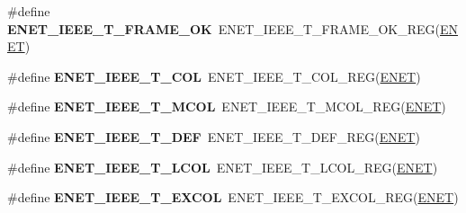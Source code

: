 \begin{DoxyCompactItemize}
\item 
\#define {\bfseries E\+N\+E\+T\+\_\+\+I\+E\+E\+E\+\_\+\+T\+\_\+\+F\+R\+A\+M\+E\+\_\+\+OK}~E\+N\+E\+T\+\_\+\+I\+E\+E\+E\+\_\+\+T\+\_\+\+F\+R\+A\+M\+E\+\_\+\+O\+K\+\_\+\+R\+EG(\hyperlink{group__ENET__Peripheral__Access__Layer_ga4745105f505f3ab949d6a57fbe2a0ed5}{E\+N\+ET})\hypertarget{group__ENET__Register__Accessor__Macros_ga321b9547e8c7a8dd69206b0d86ba917b}{}\label{group__ENET__Register__Accessor__Macros_ga321b9547e8c7a8dd69206b0d86ba917b}

\item 
\#define {\bfseries E\+N\+E\+T\+\_\+\+I\+E\+E\+E\+\_\+\+T\+\_\+C\+OL}~E\+N\+E\+T\+\_\+\+I\+E\+E\+E\+\_\+\+T\+\_\+C\+O\+L\+\_\+\+R\+EG(\hyperlink{group__ENET__Peripheral__Access__Layer_ga4745105f505f3ab949d6a57fbe2a0ed5}{E\+N\+ET})\hypertarget{group__ENET__Register__Accessor__Macros_gae66d0c804b174cf33bec1d515ea032e8}{}\label{group__ENET__Register__Accessor__Macros_gae66d0c804b174cf33bec1d515ea032e8}

\item 
\#define {\bfseries E\+N\+E\+T\+\_\+\+I\+E\+E\+E\+\_\+\+T\+\_\+\+M\+C\+OL}~E\+N\+E\+T\+\_\+\+I\+E\+E\+E\+\_\+\+T\+\_\+\+M\+C\+O\+L\+\_\+\+R\+EG(\hyperlink{group__ENET__Peripheral__Access__Layer_ga4745105f505f3ab949d6a57fbe2a0ed5}{E\+N\+ET})\hypertarget{group__ENET__Register__Accessor__Macros_gad96c85c312dbc71abf1716be0e465139}{}\label{group__ENET__Register__Accessor__Macros_gad96c85c312dbc71abf1716be0e465139}

\item 
\#define {\bfseries E\+N\+E\+T\+\_\+\+I\+E\+E\+E\+\_\+\+T\+\_\+\+D\+EF}~E\+N\+E\+T\+\_\+\+I\+E\+E\+E\+\_\+\+T\+\_\+\+D\+E\+F\+\_\+\+R\+EG(\hyperlink{group__ENET__Peripheral__Access__Layer_ga4745105f505f3ab949d6a57fbe2a0ed5}{E\+N\+ET})\hypertarget{group__ENET__Register__Accessor__Macros_ga669d751037e044b7415910a465762fd5}{}\label{group__ENET__Register__Accessor__Macros_ga669d751037e044b7415910a465762fd5}

\item 
\#define {\bfseries E\+N\+E\+T\+\_\+\+I\+E\+E\+E\+\_\+\+T\+\_\+\+L\+C\+OL}~E\+N\+E\+T\+\_\+\+I\+E\+E\+E\+\_\+\+T\+\_\+\+L\+C\+O\+L\+\_\+\+R\+EG(\hyperlink{group__ENET__Peripheral__Access__Layer_ga4745105f505f3ab949d6a57fbe2a0ed5}{E\+N\+ET})\hypertarget{group__ENET__Register__Accessor__Macros_ga910889e1ce4ca3cb9c3cb3cca360c9a9}{}\label{group__ENET__Register__Accessor__Macros_ga910889e1ce4ca3cb9c3cb3cca360c9a9}

\item 
\#define {\bfseries E\+N\+E\+T\+\_\+\+I\+E\+E\+E\+\_\+\+T\+\_\+\+E\+X\+C\+OL}~E\+N\+E\+T\+\_\+\+I\+E\+E\+E\+\_\+\+T\+\_\+\+E\+X\+C\+O\+L\+\_\+\+R\+EG(\hyperlink{group__ENET__Peripheral__Access__Layer_ga4745105f505f3ab949d6a57fbe2a0ed5}{E\+N\+ET})\hypertarget{group__ENET__Register__Accessor__Macros_gac4beb3a2331f2a6497df362de43e3072}{}\label{group__ENET__Register__Accessor__Macros_gac4beb3a2331f2a6497df362de43e3072}


\end{DoxyCompactItemize}
